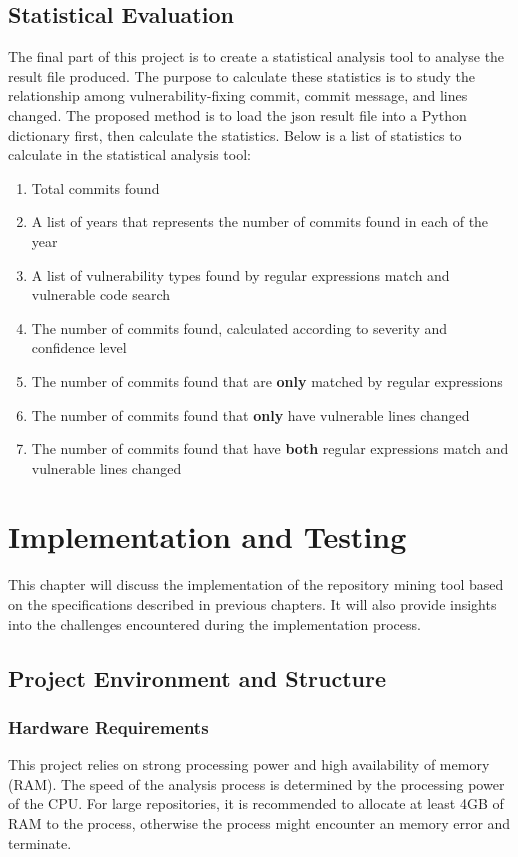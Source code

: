 \documentclass[12pt, a4paper]{report}
\begin{document}
\section{Statistical Evaluation}
The final part of this project is to create a statistical analysis tool to analyse the result file
produced. The purpose to calculate these statistics is to study the relationship among
vulnerability-fixing commit, commit message, and lines changed. The proposed method is to load the
\acrshort{json} result file into a Python dictionary first, then calculate the statistics. Below is
a list of statistics to calculate in the statistical analysis tool:
\begin{enumerate}
  \item Total commits found
  \item A list of years that represents the number of commits found in each of the year
  \item A list of vulnerability types found by regular expressions match and vulnerable code search
  \item The number of commits found, calculated according to severity and confidence level
  \item The number of commits found that are \textbf{only} matched by regular expressions
  \item The number of commits found that \textbf{only} have vulnerable lines changed
  \item The number of commits found that have \textbf{both} regular expressions match and vulnerable
  lines changed
\end{enumerate}

\chapter{Implementation and Testing} \label{chap:implementation}
This chapter will discuss the implementation of the repository mining tool based on the
specifications described in previous chapters. It will also provide insights into the challenges
encountered during the implementation process.

\section{Project Environment and Structure}
\subsection{Hardware Requirements}
This project relies on strong processing power and high availability of memory (RAM). The speed of
the analysis process is determined by the processing power of the CPU. For large repositories, it is
recommended to allocate at least 4GB of RAM to the process, otherwise the process might encounter an
memory error and terminate.
\end{document}
